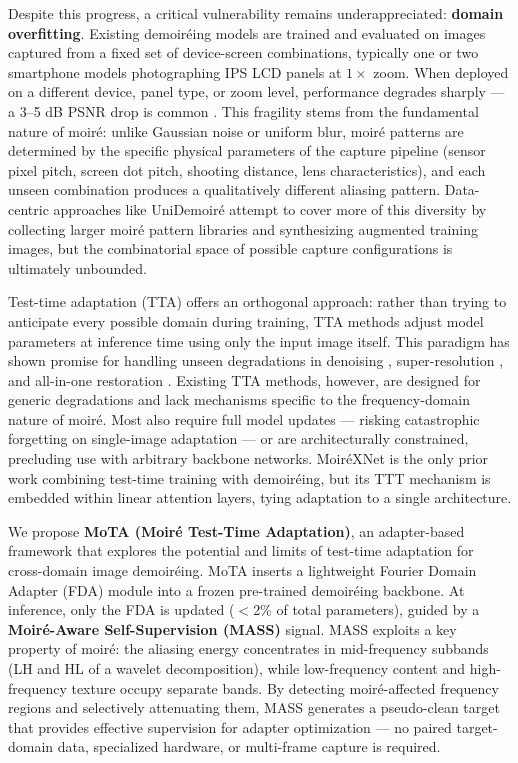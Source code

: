 \documentclass[10pt,twocolumn,letterpaper]{article}
\begin{document}
Despite this progress, a critical vulnerability remains underappreciated: \textbf{domain overfitting}. Existing demoir\'{e}ing models are trained and evaluated on images captured from a fixed set of device-screen combinations, typically one or two smartphone models photographing IPS LCD panels at $1\times$ zoom. When deployed on a different device, panel type, or zoom level, performance degrades sharply --- a 3--5 dB PSNR drop is common \cite{yang2025unidemoire}. This fragility stems from the fundamental nature of moir\'{e}: unlike Gaussian noise or uniform blur, moir\'{e} patterns are determined by the specific physical parameters of the capture pipeline (sensor pixel pitch, screen dot pitch, shooting distance, lens characteristics), and each unseen combination produces a qualitatively different aliasing pattern. Data-centric approaches like UniDemoir\'{e} \cite{yang2025unidemoire} attempt to cover more of this diversity by collecting larger moir\'{e} pattern libraries and synthesizing augmented training images, but the combinatorial space of possible capture configurations is ultimately unbounded.

Test-time adaptation (TTA) \cite{tang2026degradation,gou2024testtime,li2026testtime} offers an orthogonal approach: rather than trying to anticipate every possible domain during training, TTA methods adjust model parameters at inference time using only the input image itself. This paradigm has shown promise for handling unseen degradations in denoising \cite{mansour2024tttmim}, super-resolution \cite{deng2023efficient}, and all-in-one restoration \cite{tang2026degradation}. Existing TTA methods, however, are designed for generic degradations and lack mechanisms specific to the frequency-domain nature of moir\'{e}. Most also require full model updates --- risking catastrophic forgetting on single-image adaptation --- or are architecturally constrained, precluding use with arbitrary backbone networks. Moir\'{e}XNet \cite{li2025moirexnet} is the only prior work combining test-time training with demoir\'{e}ing, but its TTT mechanism is embedded within linear attention layers, tying adaptation to a single architecture.

We propose \textbf{MoTA (Moir\'{e} Test-Time Adaptation)}, an adapter-based framework that explores the potential and limits of test-time adaptation for cross-domain image demoir\'{e}ing. MoTA inserts a lightweight Fourier Domain Adapter (FDA) module into a frozen pre-trained demoir\'{e}ing backbone. At inference, only the FDA is updated ($<$2\% of total parameters), guided by a \textbf{Moir\'{e}-Aware Self-Supervision (MASS)} signal. MASS exploits a key property of moir\'{e}: the aliasing energy concentrates in mid-frequency subbands (LH and HL of a wavelet decomposition), while low-frequency content and high-frequency texture occupy separate bands. By detecting moir\'{e}-affected frequency regions and selectively attenuating them, MASS generates a pseudo-clean target that provides effective supervision for adapter optimization --- no paired target-domain data, specialized hardware, or multi-frame capture is required.
\end{document}

